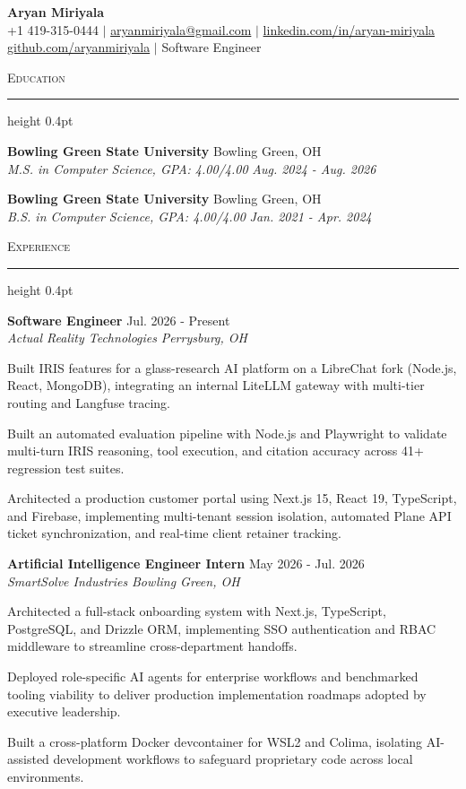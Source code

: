 \documentclass[letterpaper,11pt]{article}
\newcommand{\resumesection}[1]{%
  \par\vspace{2pt}%
  {\large\scshape #1}\par\vspace{2pt}%
  \hrule height 0.4pt\vspace{2pt}%
}
\newcommand{\resumeSubheading}[4]{
  \textbf{#1} \hfill #2\\
  \textit{#3} \hfill \textit{#4}
}
\begin{document}
\begin{center}
  {\LARGE \textbf{Aryan Miriyala}}\\[2pt]
  \small
  +1 419-315-0444 $|$ \href{mailto:aryanmiriyala@gmail.com}{aryanmiriyala@gmail.com} $|$ \href{https://www.linkedin.com/in/aryan-miriyala-7788a21b6/}{linkedin.com/in/aryan-miriyala}\\
  \href{https://github.com/aryanmiriyala}{github.com/aryanmiriyala} $|$ Software Engineer
\end{center}\vspace{-6pt}

\resumesection{Education}
\resumeSubheading
{Bowling Green State University}{Bowling Green, OH}
{M.S. in Computer Science, GPA: 4.00/4.00}{Aug. 2024 - Aug. 2026}

\resumeSubheading
{Bowling Green State University}{Bowling Green, OH}
{B.S. in Computer Science, GPA: 4.00/4.00}{Jan. 2021 - Apr. 2024}

\resumesection{Experience}
\resumeSubheading
{Software Engineer}{Jul. 2026 - Present}
{Actual Reality Technologies}{Perrysburg, OH}
\begin{tightitemize}
  \item Built IRIS features for a glass-research AI platform on a LibreChat fork (Node.js, React, MongoDB), integrating an internal LiteLLM gateway with multi-tier routing and Langfuse tracing.
  \item Built an automated evaluation pipeline with Node.js and Playwright to validate multi-turn IRIS reasoning, tool execution, and citation accuracy across 41+ regression test suites.
  \item Architected a production customer portal using Next.js 15, React 19, TypeScript, and Firebase, implementing multi-tenant session isolation, automated Plane API ticket synchronization, and real-time client retainer tracking.
\end{tightitemize}

\resumeSubheading
{Artificial Intelligence Engineer Intern}{May 2026 - Jul. 2026}
{SmartSolve Industries}{Bowling Green, OH}
\begin{tightitemize}
  \item Architected a full-stack onboarding system with Next.js, TypeScript, PostgreSQL, and Drizzle ORM, implementing SSO authentication and RBAC middleware to streamline cross-department handoffs.
  \item Deployed role-specific AI agents for enterprise workflows and benchmarked tooling viability to deliver production implementation roadmaps adopted by executive leadership.
  \item Built a cross-platform Docker devcontainer for WSL2 and Colima, isolating AI-assisted development workflows to safeguard proprietary code across local environments.
\end{tightitemize}
\end{document}
